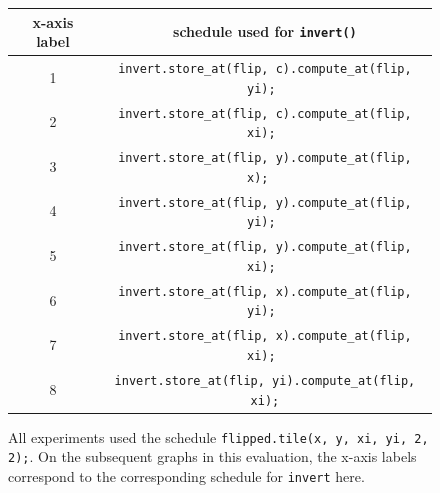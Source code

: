 \documentclass{article}
\begin{document}
\begin{figure}[h]
	\begin{center}
	\begin{tabular}{c|c}
		x-axis label & schedule used for \texttt{invert()} \\
		\hline
                1 & \texttt{invert.store\_at(flip, c).compute\_at(flip, yi);~} \\
                2 & \texttt{invert.store\_at(flip, c).compute\_at(flip, xi);~} \\
                3 & \texttt{invert.store\_at(flip, y).compute\_at(flip, x);~~} \\
                4 & \texttt{invert.store\_at(flip, y).compute\_at(flip, yi);~} \\
                5 & \texttt{invert.store\_at(flip, y).compute\_at(flip, xi);~} \\
                6 & \texttt{invert.store\_at(flip, x).compute\_at(flip, yi);~} \\
                7 & \texttt{invert.store\_at(flip, x).compute\_at(flip, xi);~} \\
                8 & \texttt{invert.store\_at(flip, yi).compute\_at(flip, xi);} 
	\end{tabular}
	\end{center}
	\caption{All experiments used the schedule \texttt{flipped.tile(x, y, xi, yi, 2, 2);}. On the subsequent graphs in this evaluation, the x-axis labels correspond to the corresponding schedule for \texttt{invert} here.}
	\label{fig:eval-scheds}
\end{figure}
\end{document}
